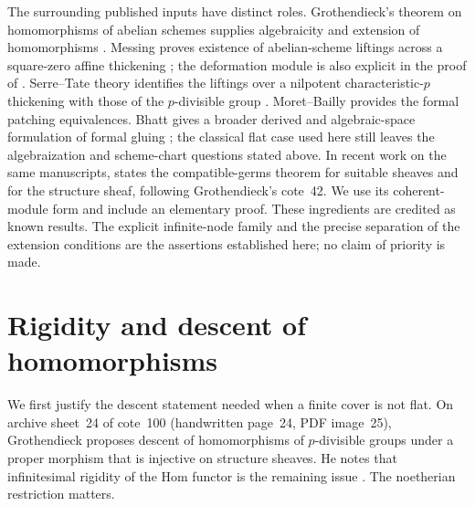 \documentclass[11pt]{article}
\theoremstyle{definition}\newtheorem{definition}[theorem]{Definition}
\theoremstyle{remark}\newtheorem{remark}[theorem]{Remark}
\begin{document}
The surrounding published inputs have distinct roles. Grothendieck's theorem on homomorphisms of abelian schemes supplies algebraicity and extension of homomorphisms \citep[Proposition~1.2 and Lemma~1.2.1, pp.~64--65]{GrothHom}. Messing proves existence of abelian-scheme liftings across a square-zero affine thickening \citep[Chapter~IV, Lemma~2.8.1, pp.~148--149]{Messing}; the deformation module is also explicit in the proof of \citet[Lemma~24, p.~590]{VasiuZink}. Serre--Tate theory identifies the liftings over a nilpotent characteristic-$p$ thickening with those of the $p$-divisible group \citep[Theorem~1.2.1, pp.~143--146]{Katz}. Moret--Bailly provides the formal patching equivalences. Bhatt gives a broader derived and algebraic-space formulation of formal gluing \citep[Theorem~1.4, preprint p.~2]{Bhatt}; the classical flat case used here still leaves the algebraization and scheme-chart questions stated above. In recent work on the same manuscripts, \citet[\S31, p.~138]{Hua} states the compatible-germs theorem for suitable sheaves and for the structure sheaf, following Grothendieck's cote~42. We use its coherent-module form and include an elementary proof. These ingredients are credited as known results. The explicit infinite-node family and the precise separation of the extension conditions are the assertions established here; no claim of priority is made.

\section{Rigidity and descent of homomorphisms}

We first justify the descent statement needed when a finite cover is not flat. On archive sheet~24 of cote~100 (handwritten page~24, PDF image~25), Grothendieck proposes descent of homomorphisms of $p$-divisible groups under a proper morphism that is injective on structure sheaves. He notes that infinitesimal rigidity of the Hom functor is the remaining issue \citep{GrothNotes}. The noetherian restriction matters.
\end{document}
